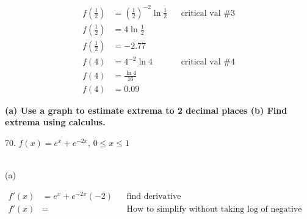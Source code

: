 \documentclass{article}
\begin{document}
\begin{description}
\begin{description}
\begin{align*}
                        f\left(\frac{1}{2}\right) & = \left(\frac{1}{2}\right)^{-2}\ln{\frac{1}{2}} &  & \text{critical val \#3} \\
                        f\left(\frac{1}{2}\right) & = 4\ln{\frac{1}{2}}                                                          \\
                        f\left(\frac{1}{2}\right) & = -2.77                                                                      \\[2em]
                        f(4)                      & = 4^{-2}\ln{4}                                  &  & \text{critical val \#4} \\
                        f(4)                      & = \frac{\ln{4}}{16}                                                          \\
                        f(4)                      & = 0.09
                    \end{align*}
          \end{description}
    \item\textbf{(a) Use a graph to estimate extrema to 2 decimal places (b) Find extrema using calculus. }
          \begin{description}
              \setlength\itemsep{3em}
              \item 70. $f(x) = e^x + e^{-2x}$, \space $0 \leq x \leq 1$

                     \\

                    (a) 

                    \begin{align*}
                        f'(x) & = e^x + e^{-2x}(-2) &  & \text{find derivative}                                        \\
                        f'(x) & =                   &  & \text{How to simplify without taking log of negative number?} \\
                    \end{align*}
          \end{description}
\end{description}
\end{document}
